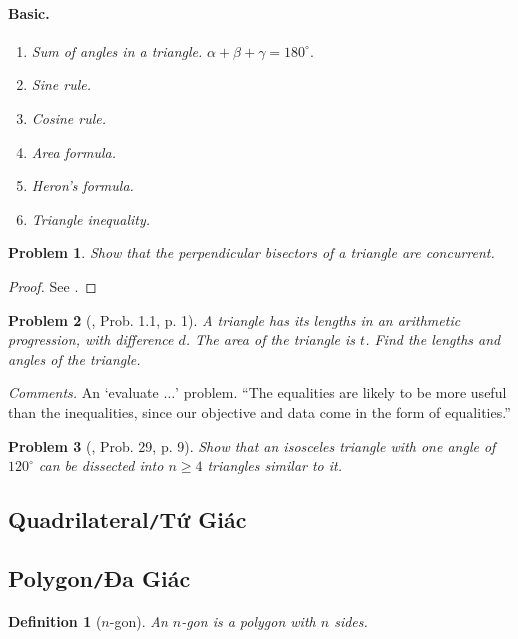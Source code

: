 \documentclass[oneside]{book}
\numberwithin{equation}{section}
\newtheorem{definition}{Definition}[section]
\newtheorem{problem}{Problem}[section]
\begin{document}
\paragraph{Basic.}
\begin{enumerate}
	\item \textit{Sum of angles in a triangle.} $\alpha + \beta + \gamma = 180^\circ$.
	\item \textit{Sine rule.}
	\item \textit{Cosine rule.}
	\item \textit{Area formula.}
	\item \textit{Heron's formula.}
	\item \textit{Triangle inequality.}
\end{enumerate}

\begin{problem}
	Show that the perpendicular bisectors of a triangle are concurrent.
\end{problem}

\begin{proof}[Proof]
	See \cite[p. ix]{Tao2006}.
\end{proof}

\begin{problem}[\cite{Tao2006}, Prob. 1.1, p. 1]
	A triangle has its lengths in an arithmetic progression, with difference $d$. The area of the triangle is $t$. Find the lengths and angles of the triangle.
\end{problem}
\textit{Comments.} An `evaluate $\ldots$' problem. ``The equalities are likely to be more useful than the inequalities, since our objective and data come in the form of equalities.''

\begin{problem}[\cite{Gelca_Andreescu2017}, Prob. 29, p. 9]
	Show that an isosceles triangle with one angle of $120^\circ$ can be dissected into $n\ge 4$ triangles similar to it.
\end{problem}

\subsection{Quadrilateral\texttt{/}Tứ Giác}

\subsection{Polygon\texttt{/}Đa Giác}

\begin{definition}[$n$-gon]
	An \emph{$n$-gon} is a polygon with $n$ sides.
\end{definition}
\end{document}
